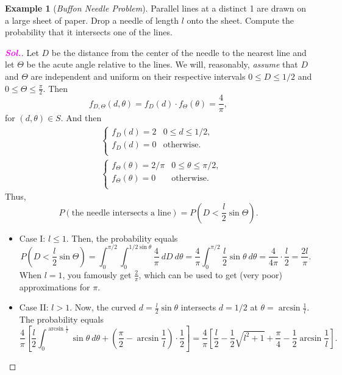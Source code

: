 \documentclass[12pt,a4paper]{article}
\theoremstyle{definition}
\newtheorem{example}{Example}[section]
\theoremstyle{definition}
\theoremstyle{definition}
\theoremstyle{definition}
\theoremstyle{remark}
\theoremstyle{definition}
\newcommand{\dispsty}{\displaystyle}
\newcommand{\sol}{\textcolor{magenta}{\bf \textit{Sol.}}\quad}
\begin{document}
\begin{example}[\it Buffon Needle Problem]
	Parallel lines at a distinct 1 are drawn on a large sheet of paper. Drop a needle of length $l$ onto the sheet. Compute the probability that it intersects one of the lines. \begin{proof}[\sol]
		Let $D$ be the distance from the center of the needle to the nearest line and let $\Theta$ be the acute angle relative to the lines. We will, reasonably, \textit{assume} that $D$ and $\Theta$ are independent and uniform on their respective intervals $\dispsty 0\leq D\leq 1/2$ and $0\leq\Theta\leq\frac{\pi}{2}$. Then \[
		f_{D,\Theta}(d,\theta)=f_D(d)\cdot f_{\Theta}(\theta)=\frac{4}{\pi},
		\] for $(d,\theta)\in S$. And then \begin{align*}
		&\begin{cases}
		f_D(d)=2 &0\leq d\leq1/2,\\
		f_D(d)=0 &\text{otherwise}.\\
		\end{cases}\\
		&\begin{cases}
		f_\Theta(\theta)={2}/{\pi} &0\leq \theta\leq\pi/2,\\
		f_\Theta(\theta)=0 &\text{otherwise}.\\
		\end{cases}
		\end{align*} Thus, \[
		P(\text{the needle intersects a line})=P\left(D<\frac{l}{2}\sin\Theta\right).
		\]\begin{itemize}
			\item Case I: $l\leq 1$. Then, the probability equals \[
			P\left(D<\frac{l}{2}\sin\Theta\right)=\int_0^{\pi/2}\int_0^{1/2\sin\theta}\frac{4}{\pi}\ dD\ d\theta=\frac{4}{\pi}\int_0^{\pi/2}\frac{l}{2}\sin\theta\ d\theta=\frac{4}{4\pi}\cdot\frac{l}{2}=\frac{2l}{\pi}.
			\] When $l=1$, you famously get $\dispsty\frac{2}{\pi}$, which can be used to get (very poor) approximations for $\pi$.\\
			\item Case II: $l>1$. Now, the curved $d=\dispsty\frac{l}{2}\sin\theta$ intersects $d=1/2$ at $\theta=\arcsin\dispsty\frac{1}{l}$. The probability equals \[
			\frac{4}{\pi}\left[\frac{l}{2}\int_0^{\arcsin\frac{1}{l}}\sin\theta\ d\theta+\left(\frac{\pi}{2}-\arcsin\frac{1}{l}\right)\cdot\frac{1}{2}\right]=\frac{4}{\pi}\left[\frac{l}{2}-\frac{1}{2}\sqrt{l^2+1}+\frac{\pi}{4}-\frac{1}{2}\arcsin\frac{1}{l}\right].
			\]
	\end{itemize}
	\end{proof}
\end{example}
\end{document}

